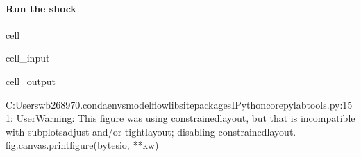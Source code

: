 \documentclass[letterpaper,10pt,english]{jupyterBook}
\begin{document}
\paragraph{Run the shock}
\label{\detokenize{content/05_WBModels/ScenarioAnalysis:run-the-shock}}
\begin{sphinxuseclass}{cell}\begin{sphinxVerbatimInput}

\begin{sphinxuseclass}{cell_input}
\begin{sphinxVerbatim}[commandchars=\\\{\}]
  
\PYG{p}{[}\PYG{p}{]}
\end{sphinxVerbatim}

\end{sphinxuseclass}\end{sphinxVerbatimInput}
\begin{sphinxVerbatimOutput}

\begin{sphinxuseclass}{cell_output}
\begin{sphinxVerbatim}[commandchars=\\\{\}]
C:\PYGZbs{}Users\PYGZbs{}wb268970\PYGZbs{}.conda\PYGZbs{}envs\PYGZbs{}modelflow\PYGZbs{}lib\PYGZbs{}site\PYGZhy{}packages\PYGZbs{}IPython\PYGZbs{}core\PYGZbs{}pylabtools.py:151: UserWarning: This figure was using constrained\PYGZus{}layout, but that is incompatible with subplots\PYGZus{}adjust and/or tight\PYGZus{}layout; disabling constrained\PYGZus{}layout.
  fig.canvas.print\PYGZus{}figure(bytes\PYGZus{}io, **kw)
\end{sphinxVerbatim}

\noindent{}

\end{sphinxuseclass}\end{sphinxVerbatimOutput}

\end{sphinxuseclass}
\end{document}
